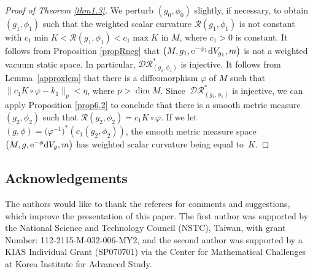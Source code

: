 \documentclass[pdftex]{sigma}
\numberwithin{equation}{section}
\begin{document}
\begin{proof}[Proof of Theorem \ref{thm1.3}]
We perturb $(g_0,\phi_0)$ slightly, if necessary, to obtain $(g_1,\phi_1)$
such that the weighted scalar curvature $\mathcal{R}(g_1,\phi_1)$ is not constant
with $c_1\min K< \mathcal{R}(g_1,\phi_1)<c_1\max K$ in $M$, where $c_1>0$ is constant. It follows from Proposition \ref{propRneg} that $\bigl(M,g_1,{\rm e}^{-\phi_1}{\rm d}V_{g_1},m\bigr)$ is not a weighted vacuum static space.
In particular, $\mathcal{DR}_{(g_1,\phi_1)}^*$ is injective. It follows from Lemma~\ref{approxlem} that there is a diffeomorphism $\varphi$ of $M$ such that $\|c_1K\circ\varphi-k_1\|_p<\eta$, where $p>\dim M$. Since~$\mathcal{DR}_{(g_1,\phi_1)}^*$ is injective,
we can apply Proposition \ref{prop6.2} to conclude that
there is a smooth metric measure $(g_2,\phi_2)$ such that $\mathcal{R}(g_2,\phi_2)=c_1K\circ \varphi$.
If we let $(g,\phi)=\bigl(\varphi^{-1}\bigr)^* (c_1(g_2,\phi_2) )$,
the smooth metric measure space $\bigl(M,g,{\rm e}^{-\phi}{\rm d}V_g,m\bigr)$ has weighted scalar curvature being equal to~$K$.
\end{proof}


\subsection*{Acknowledgements}
The authors would like to thank the referees for comments and suggestions, which improve the presentation of this paper.
The first author was supported by the National Science and Technology Council (NSTC),
Taiwan, with grant Number: 112-2115-M-032-006-MY2,
and the second author was supported by a KIAS Individual Grant (SP070701) via the Center for Mathematical Challenges at Korea Institute for Advanced Study.
\end{document}
